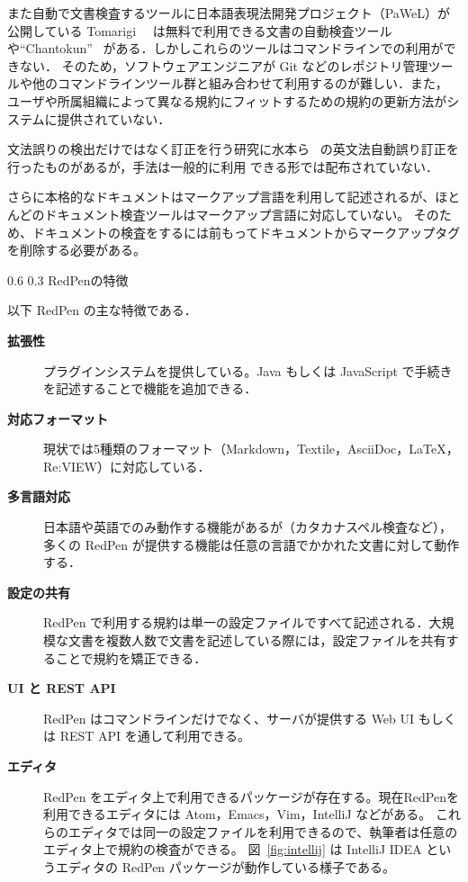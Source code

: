 \documentclass[a4j,twocolumn]{jarticle}
\makeatletter
\def\section{\@startsection{section}{1}{\z@}%
   {0.6\Cvs}%
   {0.3\Cvs}%
   {\reset@font\fontsize{10.5pt}{0pt}\bfseries}}
\makeatother
\begin{document}
また自動で文書検査するツールに日本語表現法開発プロジェクト（PaWeL）が公開している Tomarigi~\cite{tomarigi}~\cite{tomarigi-paper}
は無料で利用できる文書の自動検査ツールや``Chantokun''~\cite{chantokun} がある．しかしこれらのツールはコマンドラインでの利用ができない．
そのため，ソフトウェアエンジニアが Git などのレポジトリ管理ツールや他のコマンドラインツール群と組み合わせて利用するのが難しい．また，
ユーザや所属組織によって異なる規約にフィットするための規約の更新方法がシステムに提供されていない． 

文法誤りの検出だけではなく訂正を行う研究に水本ら~\cite{mizumoto12english} の英文法自動誤り訂正を行ったものがあるが，手法は一般的に利用
できる形では配布されていない．

さらに本格的なドキュメントはマークアップ言語を利用して記述されるが、ほとんどのドキュメント検査ツールはマークアップ言語に対応していない。
そのため、ドキュメントの検査をするには前もってドキュメントからマークアップタグを削除する必要がある。

\section{RedPenの特徴}

以下 RedPen の主な特徴である．

\begin{description}

\item[{\bf 拡張性}] 
   プラグインシステムを提供している。Java もしくは JavaScript で手続きを記述することで機能を追加できる．

\item[{\bf 対応フォーマット}]
  現状では5種類のフォーマット（Markdown，Textile，AsciiDoc，LaTeX，Re:VIEW）に対応している．

\item[{\bf 多言語対応}]
  日本語や英語でのみ動作する機能があるが（カタカナスペル検査など），多くの RedPen が提供する機能は任意の言語でかかれた文書に対して動作する．

\item[{\bf 設定の共有}]
  RedPen で利用する規約は単一の設定ファイルですべて記述される．大規模な文書を複数人数で文書を記述している際には，設定ファイルを共有することで規約を矯正できる．

\item[{\bf UI と REST API}]
  RedPen はコマンドラインだけでなく、サーバが提供する Web UI もしくは REST API を通して利用できる。

\item[{\bf エディタ}]
  RedPen をエディタ上で利用できるパッケージが存在する。現在RedPenを利用できるエディタには Atom，Emacs，Vim，IntelliJ などがある。
  これらのエディタでは同一の設定ファイルを利用できるので、執筆者は任意のエディタ上で規約の検査ができる。
  図~\ref{fig:intellij} は IntelliJ IDEA というエディタの RedPen パッケージが動作している様子である。

\end{description}
\end{document}
